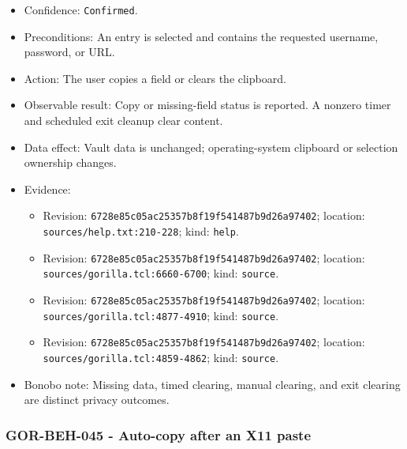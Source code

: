 \documentclass[
  letterpaper,
]{article}
\newcommand{\passthrough}[1]{#1}
\providecommand{\tightlist}{%
  \setlength{\itemsep}{0pt}\setlength{\parskip}{0pt}}
\begin{document}
\begin{itemize}
\tightlist
\item
  Confidence: \passthrough{\lstinline!Confirmed!}.
\item
  Preconditions: An entry is selected and contains the requested username, password, or URL.
\item
  Action: The user copies a field or clears the clipboard.
\item
  Observable result: Copy or missing-field status is reported. A nonzero timer and scheduled exit cleanup clear content.
\item
  Data effect: Vault data is unchanged; operating-system clipboard or selection ownership changes.
\item
  Evidence:

  \begin{itemize}
  \tightlist
  \item
    Revision: \nolinkurl{6728e85c05ac25357b8f19f541487b9d26a97402}; location: \nolinkurl{sources/help.txt:210-228};
    kind: \passthrough{\lstinline!help!}.
  \item
    Revision: \nolinkurl{6728e85c05ac25357b8f19f541487b9d26a97402}; location: \nolinkurl{sources/gorilla.tcl:6660-6700};
    kind: \passthrough{\lstinline!source!}.
  \item
    Revision: \nolinkurl{6728e85c05ac25357b8f19f541487b9d26a97402}; location: \nolinkurl{sources/gorilla.tcl:4877-4910};
    kind: \passthrough{\lstinline!source!}.
  \item
    Revision: \nolinkurl{6728e85c05ac25357b8f19f541487b9d26a97402}; location: \nolinkurl{sources/gorilla.tcl:4859-4862};
    kind: \passthrough{\lstinline!source!}.
  \end{itemize}
\item
  Bonobo note: Missing data, timed clearing, manual clearing, and exit clearing are distinct privacy outcomes.
\end{itemize}

\subsubsection{GOR-BEH-045 - Auto-copy after an X11 paste}\label{gor-beh-045---auto-copy-after-an-x11-paste}
\end{document}
